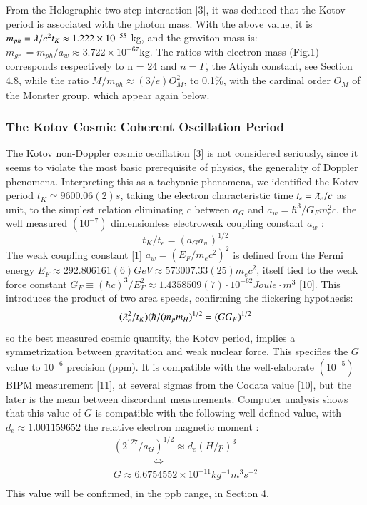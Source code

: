 \documentclass[twoside,draft]{article}
\begin{document}
\begin{sloppypar}
{From the Holographic two-step interaction [3], it was deduced that the Kotov period is
associated with the photon mass. With the above value, it is $m_{ph} = \lambdabar/c^{2} t_{K} \approx 1.222 \times 10^{-55}$ kg, and the graviton mass is: 
$m_{gr}\, = m_{ph} /a_{w} \approx 3.722 \times 10^{-67} $kg.
The ratios with electron mass (Fig.1) corresponds respectively to n = 24 and $n = \Gamma$, the Atiyah constant, see Section 4.8, while the ratio $M/m_{ph} \approx (3/e)O^2_M$, to 0.1\%, with the cardinal order $O_M$ of the Monster group, which appear again below.

\subsubsection{The Kotov Cosmic Coherent Oscillation Period}

The Kotov non-Doppler cosmic oscillation [3] is not considered seriously, since it seems to
violate the most basic prerequisite of physics, the generality of Doppler phenomena. Interpreting
this as a tachyonic phenomena, we identified the Kotov period $t_{K} \simeq 9600.06(2) s$, taking the electron
characteristic time $t_{e} = \lambdabar_{e} /c$ as unit, to the simplest relation eliminating $c$ between $a_{G}$ and $a_{w}=
\hbar^{3} /G_{F} m_{e}^{2} c$, the well measured $(10^{-7})$ dimensionless electroweak coupling constant $a_{w}$ :
\begin{equation}
t_{K} / t_{e} = (a_{G} a_{w})^{1/2}
\end{equation}
The weak coupling constant [1] $a_{w} = (E_{F} /m_{e} c^{2} )^{2}$ is defined from the Fermi energy 
$
E_{F} \approx 292.806161(6) GeV \approx 573007.33(25) m_{e} c^{2}
$, itself tied to the weak force constant 
$
G_{F} \equiv (\hbar c)^{3} /E_{F}^{2} \approx
1.4358509(7) \cdot 10^{-62} Joule \cdot m^{3}
$
[10]. This introduces the product of two area speeds, confirming the
flickering hypothesis:
\begin{equation}
(\lambdabar_{e}^2/t_{K} )(\hbar/(m_{p} m_{H})^{1/2} = (GG_{F})^{1/2}
\end{equation}
so the best measured cosmic quantity, the Kotov period, implies a symmetrization between
gravitation and weak nuclear force. This specifies the $G$ value to $10^{-6}$ precision (ppm). It is
compatible with the well-elaborate $(10^{-5})$ BIPM measurement [11], at several sigmas from the Codata
value [10], but the later is the mean between discordant measurements.
Computer analysis shows that this value of $G$ is compatible with the following well-defined value, with $d_{e} \approx 1.001159652$ the relative electron magnetic moment :
$$\begin{array}{ll}
(2^{127} /a_{G} )^{1/2} \approx d_{e} (H/p)^{3} \\
\qquad  \qquad \Leftrightarrow \\
G \approx 6.6754552 \times 10^{-11} kg^{-1} m^{3} s^{-2} \\
\end{array}$$
This value will be confirmed, in the ppb range, in Section 4.

}
\end{sloppypar}
\end{document}
